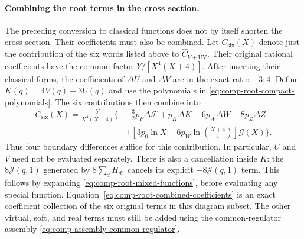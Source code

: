\paragraph{Combining the root terms in the cross section.}
The preceding conversion to classical functions does not by itself shorten
the cross section. Their coefficients must also be combined. Let
$C_{\mathrm{six}}(X)$ denote just the contribution of the six words listed
above to $\widehat C_{V+\mathrm{UV}}$. Their original rational coefficients
have the common factor $Y/[X^4(X+4)]$. After inserting their classical
forms, the coefficients of $\Delta U$ and $\Delta V$ are in the exact
ratio $-3:4$. Define $K(q)=4V(q)-3U(q)$ and use the polynomials in
\eqref{eq:comp-root-compact-polynomials}.
The six contributions then combine into
\begin{equation}
 \begin{aligned}
 C_{\mathrm{six}}(X)=\frac{Y}{X^4(X+4)}\bigg\{&
 -\frac32p_F\Delta\mathcal F+p_K\Delta K
 -6p_W\Delta W-8p_Z\Delta Z\\
 &+\left[3p_0\ln X-6p_W\ln\!\left(\frac{X+4}{4}\right)\right]
       \mathcal G(X)\bigg\}.
 \end{aligned}
 \label{eq:comp-root-combined-coefficients}
\end{equation}
Thus four boundary differences suffice for this contribution. In
particular, $U$ and $V$ need not be evaluated separately.
There is also a cancellation inside $K$: the $8\mathcal J(q,1)$
generated by $8\sum_d H_{d1}$ cancels its explicit
$-8\mathcal J(q,1)$ term. This follows by expanding
\eqref{eq:comp-root-mixed-functions}, before evaluating any special
function. Equation~\eqref{eq:comp-root-combined-coefficients} is an exact
coefficient collection of the six original terms in this diagram subset.
The other virtual, soft, and real terms must still be added using
the common-regulator assembly \eqref{eq:comp-assembly-common-regulator}.
